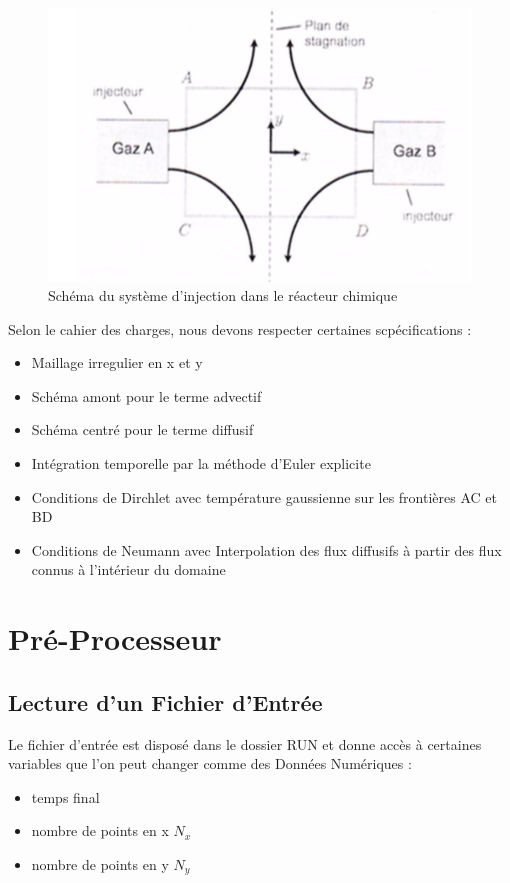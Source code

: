 \documentclass[a4paper,oneside]{article}
\makeatletter
\def\bigcenter{\trivlist \bigcentering\item\relax}
\def\bigcentering{\let\\\@centercr\rightskip\@bigflushglue%
\leftskip\@bigflushglue
\parindent\z@\parfillskip\z@skip}
\makeatother
\begin{document}
\begin{figure}[h!]
\bigcenter
\includegraphics[scale=0.8]{Schema_reacteur.PNG}
\caption{Schéma du système d'injection dans le réacteur chimique}
\end{figure}

Selon le cahier des charges, nous devons respecter certaines scpécifications :
\begin{itemize}
	\item Maillage irregulier en x et y
	\item Schéma amont pour le terme advectif
	\item Schéma centré pour le terme diffusif
	\item Intégration temporelle par la méthode d'Euler explicite
	\item Conditions de Dirchlet avec température gaussienne sur les frontières AC et BD
	\item Conditions de Neumann avec Interpolation des flux diffusifs à partir des flux connus à l'intérieur du domaine
\end{itemize}


\section{Pré-Processeur}
\subsection{Lecture d'un Fichier d'Entrée}

Le fichier d'entrée est disposé dans le dossier RUN et donne accès à certaines variables que l'on peut changer comme des Données Numériques :
\begin{itemize}
	\item temps final
	\item nombre de points en x $N_x$
	\item nombre de points en y $N_y$
\end{itemize}
\end{document}
